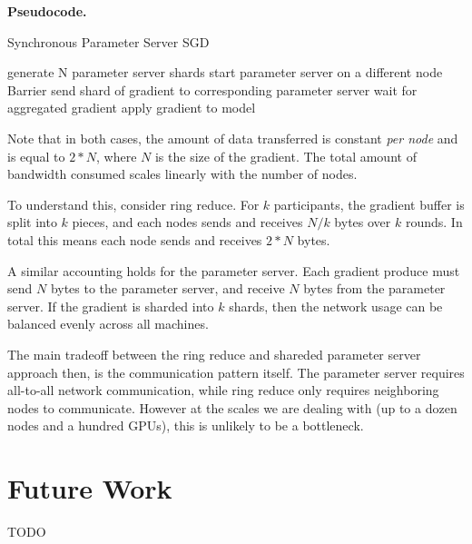 \documentclass{article}
\begin{document}
\textbf{Pseudocode.}
\begin{algorithm}
\caption{Synchronous Parameter Server SGD}
 {
}
generate N parameter server shards\;
 {
    start parameter server on a different node \;
}
Barrier\;
 {
send shard of gradient to corresponding parameter server \;
wait for aggregated gradient \;
apply gradient to model \;
}
\end{algorithm}

Note that in both cases, the amount of data transferred is constant \textit{per node} and is equal to $2 * N$, where $N$ is the size of the gradient. The total amount of bandwidth consumed scales linearly with the number of nodes.

To understand this, consider ring reduce. For $k$ participants, the gradient buffer is split into $k$ pieces, and each nodes sends and receives $N / k$ bytes over $k$ rounds. In total this means each node sends and receives $2 * N$ bytes.

A similar accounting holds for the parameter server. Each gradient produce must send $N$ bytes to the parameter server, and receive $N$ bytes from the parameter server. If the gradient is sharded into $k$ shards, then the network usage can be balanced evenly across all machines.

The main tradeoff between the ring reduce and shareded parameter server approach then, is the communication pattern itself. The parameter server requires all-to-all network communication, while ring reduce only requires neighboring nodes to communicate. However at the scales we are dealing with (up to a dozen nodes and a hundred GPUs), this is unlikely to be a bottleneck.





\section{Future Work}
{\color{red} TODO}


{
\footnotesize


}
\end{document}
